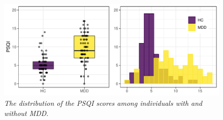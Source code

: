 \documentclass{article}
\begin{document}
\begin{figure}[h]%
\centerline{\includegraphics[]{../figs/psqi_plots.pdf}}
\caption{\emph{The distribution of the PSQI scores among individuals with and without MDD}.}
\label{fig:psqi_plots}
\end{figure}



\end{document}
